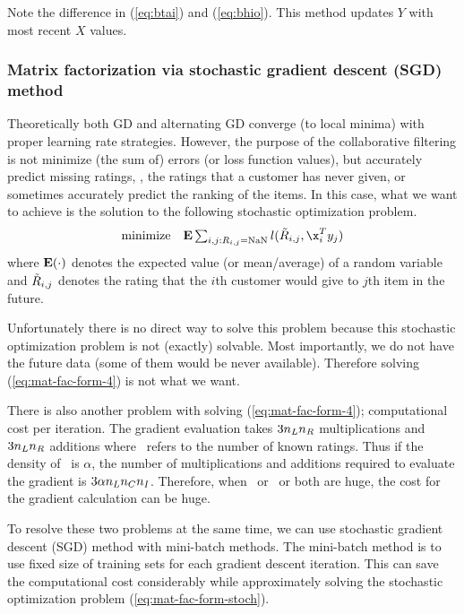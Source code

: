 Note the difference in (\ref{eq:btai}) and (\ref{eq:bhio}).
This method updates $Y$ with most recent $X$ values.

\subsubsection{Matrix factorization via stochastic gradient descent (SGD) method}

Theoretically both GD and alternating GD converge (to local minima) with proper learning rate strategies.
However, the purpose of the collaborative filtering is not minimize (the sum of) errors (or loss function values),
but accurately predict missing ratings, \ie, the ratings that a customer has never given,
or sometimes accurately predict the ranking of the items.
In this case, what we want to achieve is the solution to the following stochastic optimization problem.
\begin{equation}
\label{eq:mat-fac-form-stoch}
\begin{array}{ll}
\mbox{minimize} & \Expect \sum_{i,j:\ratmat_{i,j} = \nan} \lfcn(\tilde{\ratmat}_{i,j}, \x_i^T y_j)
\end{array}
\end{equation}
where $\mathbf{E}(\cdot)$ denotes the expected value (or mean/average) of a random variable
and $\tilde{R}_{i,j}$ denotes the rating that the $i$th customer would give to $j$th item in the future.

Unfortunately there is no direct way to solve this problem
because this stochastic optimization problem is not (exactly) solvable.
Most importantly, we do not have the future data (some of them would be never available).
Therefore solving (\ref{eq:mat-fac-form-4}) is not what we want.

There is also another problem with solving (\ref{eq:mat-fac-form-4}); computational cost per iteration.
The gradient evaluation takes $3{n_L} {n_R}$ multiplications and $3{n_L} {n_R}$ additions
where \numrating\ refers to the number of known ratings.
Thus if the density of \ratmat\ is $\alpha$, the number of multiplications and additions required to evaluate the gradient
is $3\alpha {n_L} {n_C} {n_I}$.
Therefore, when \numcus\ or \numitem\ or both are huge, the cost for the gradient calculation can be huge.


To resolve these two problems at the same time, we can use stochastic gradient descent (SGD) method with mini-batch methods.
The mini-batch method is to use fixed size of training sets for each gradient descent iteration.
This can save the computational cost considerably while approximately solving the stochastic optimization problem (\ref{eq:mat-fac-form-stoch}).



